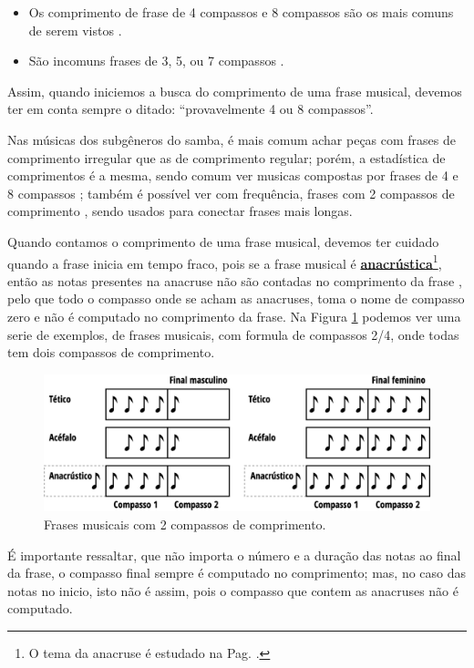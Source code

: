 \begin{itemize}
\item Os comprimento de frase de 4 compassos  e 8 compassos 
são os mais comuns de serem vistos
\cite[pp. 624]{latham2008diccionario} \cite[pp. 335]{medteoria} \cite[pp. 34]{bennett1993elementos} %
\cite[pp. 335]{medteoria} \cite[pp. 34]{bennett1993elementos}. %
\item São incomuns frases de 3, 5, ou 7 compassos \cite[pp. 34]{bennett1993elementos}.
\end{itemize}
Assim, quando iniciemos a busca do comprimento de uma frase musical,
devemos ter em conta sempre o ditado: ``provavelmente 4 ou 8 compassos''.


Nas músicas dos subgêneros do samba, 
é mais comum achar peças com frases de comprimento irregular que as de comprimento regular;
porém, a estadística de comprimentos é a mesma,
sendo comum ver musicas compostas por frases de 4 e 8 compassos 
\cite[pp. 624]{latham2008diccionario} \cite[pp. 335]{medteoria} \cite[pp. 34]{bennett1993elementos} %
\cite[pp. 335]{medteoria} \cite[pp. 34]{bennett1993elementos}; %
também é possível ver com frequência, frases com 2 compassos de comprimento 
\cite[pp. 34]{bennett1993elementos},%
sendo usados para conectar frases mais longas.



Quando contamos o comprimento de uma frase musical, 
devemos ter cuidado quando a frase inicia em tempo fraco,
pois se a frase musical é \hyperref[subsub:anacrustica]{\textbf{anacrústica}}\footnote{O 
tema da anacruse é estudado na Pag. \pageref{subsub:anacrustica}.},
então as notas presentes na anacruse não são contadas no comprimento da frase
\cite[pp. 148,150]{medteoria}, pelo que todo o compasso onde se acham as anacruses,
toma o nome de compasso zero e não é computado no comprimento da frase.
Na Figura \ref{fig:contagemtemposfrase} podemos ver uma serie de exemplos, 
de frases musicais, com formula de compassos 2/4, onde todas tem dois compassos de comprimento.
\begin{figure}[!h]
    \centering
    \includegraphics[width=\textwidth]{chapters/cap-musicalidade/contagemcompassosfrase.eps}
    \caption{Frases musicais com 2 compassos de comprimento.}
    \label{fig:contagemtemposfrase}
\end{figure}
É importante ressaltar, que não importa o número e a duração das notas ao final da frase,
o compasso final sempre é computado no comprimento;
mas, no caso das notas no inicio, isto não é assim,
pois o compasso que contem as anacruses não é computado.


